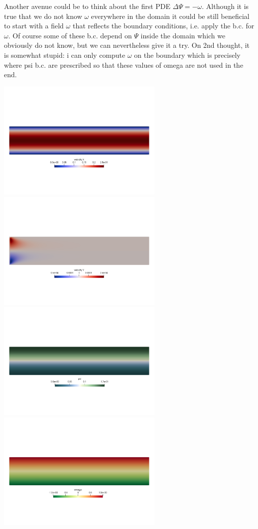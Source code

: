 Another avenue could be to think about the first PDE $\Delta \Psi = -\omega$.
Although it is true that we do not know $\omega$ everywhere in the domain it 
could be still beneficial to start with a field $\omega$ that reflects the boundary conditions, i.e. apply the b.c. for $\omega$. Of course some of these b.c. depend on $\Psi$ inside the domain which we obviously do not know, but we can nevertheless give it a try. On 2nd thought, it is somewhat stupid: i can only compute $\omega$ on the boundary which is precisely where psi b.c. are prescribed so that these values 
of omega are not used in the end.


\begin{center}
\includegraphics[width=8cm]{python_codes/fieldstone_154/results/u}
\includegraphics[width=8cm]{python_codes/fieldstone_154/results/v}\\
\includegraphics[width=8cm]{python_codes/fieldstone_154/results/psi}
\includegraphics[width=8cm]{python_codes/fieldstone_154/results/omega}
\end{center}
